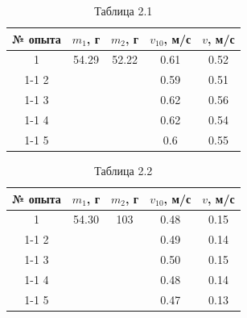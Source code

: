 \documentclass[12pt]{article}
\begin{document}
\begin{flushleft}
    \begin{table}[h]
        \centering
        \renewcommand{\arraystretch}{1.3}
        \setlength{\tabcolsep}{8pt}
        \captionsetup{justification=centering, font=bf}
        \caption{Таблица 2.1}
        \begin{tabular}{|c|c|c|c|c|}
            \hline
            № опыта & $m_1$, г & $m_2$, г & $v_{10}$, м/с & $v$, м/с \\
            \hline
            1 & 54.29 & 52.22 & 0.61 & 0.52 \\
            \cline{1-1}
            \cline{4-5}
            2 &       &     & 0.59 & 0.51 \\
            \cline{1-1}
            \cline{4-5}
            3 &       &     & 0.62 & 0.56 \\
            \cline{1-1}
            \cline{4-5}
            4 &       &     & 0.62 & 0.54 \\
            \cline{1-1}
            \cline{4-5}
            5 &       &     & 0.6 & 0.55 \\
            \hline
        \end{tabular}
    \end{table}

    \begin{table}[h]
        \centering
        \renewcommand{\arraystretch}{1.3}
        \setlength{\tabcolsep}{8pt}
        \captionsetup{justification=centering, font=bf}
        \caption{Таблица 2.2}
        \begin{tabular}{|c|c|c|c|c|}
            \hline
            № опыта & $m_1$, г & $m_2$, г & $v_{10}$, м/с & $v$, м/с \\
            \hline
            1 & 54.30 & 103 & 0.48 & 0.15 \\
            \cline{1-1}
            \cline{4-5}
            2 &       &     & 0.49 & 0.14 \\
            \cline{1-1}
            \cline{4-5}
            3 &       &     & 0.50 & 0.15 \\
            \cline{1-1}
            \cline{4-5}
            4 &       &     & 0.48 & 0.14 \\
            \cline{1-1}
            \cline{4-5}
            5 &       &     & 0.47 & 0.13 \\
            \hline
        \end{tabular}
    \end{table}

    \newpage


\end{flushleft}
\end{document}
